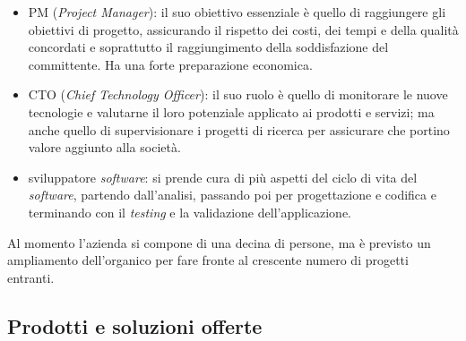 \begin{itemize}
	\item PM (\textit{Project Manager}): il suo obiettivo essenziale è quello di raggiungere gli obiettivi di progetto, assicurando il rispetto dei costi, dei tempi e della qualità concordati e soprattutto il raggiungimento della soddisfazione del committente. Ha una forte preparazione economica.
	\item CTO (\textit{Chief Technology Officer}): il suo ruolo \`e quello di monitorare le nuove tecnologie e valutarne il loro potenziale applicato ai prodotti e servizi; ma anche quello di supervisionare i progetti di ricerca per assicurare che portino valore aggiunto alla societ\`a.
	\item sviluppatore \textit{software\gloss}:  si prende cura di pi\`u aspetti del ciclo di vita del \textit{software\gloss}, partendo dall'analisi, passando poi per progettazione e codifica e terminando con il \textit{testing} e la validazione dell'applicazione. 
\end{itemize} 
\noindent
Al momento l'azienda si compone di una decina di persone, ma \`e previsto un ampliamento dell'organico per fare fronte al crescente numero di progetti entranti.

\subsection{Prodotti e soluzioni offerte}
